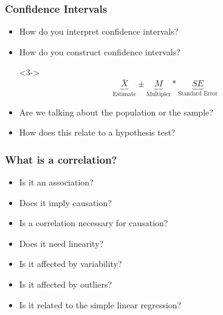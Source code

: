 \documentclass[dvipsnames]{beamer}\usepackage[]{graphicx}\usepackage[]{color}
\begin{document}
\begin{frame}
\frametitle{Confidence Intervals}
\begin{itemize}
\item<1-> How do you interpret confidence intervals?
\item<2-> How do you construct confidence intervals?

\item[]<3->$$
\underbrace{\bar{X}}_{\text{Estimate}} \pm \underbrace{M}_{\text{Multipler}} * \underbrace{SE}_{\text{Standard Error}}
$$
\item<4-> Are we talking about the population or the sample?
\item<5-> How does this relate to a hypothesis test?
\end{itemize}
\end{frame}

\begin{frame}
\frametitle{What is a correlation?}
\begin{itemize}
  \item Is it an association?
  \item Does it imply causation?
  \item Is a correlation necessary for causation?
  \item Does it need linearity?
  \item Is it affected by variability?
  \item Is it affected by outliers?
  \item Is it related to the simple linear regression?
\end{itemize}
\end{frame}
\end{document}
